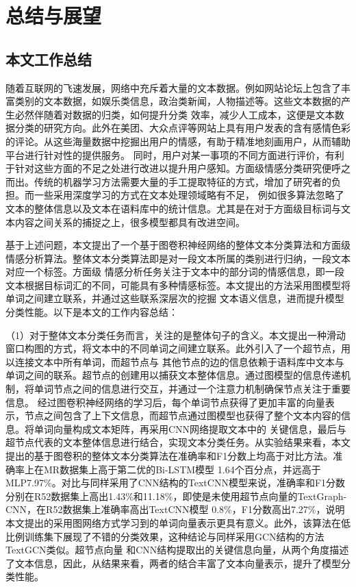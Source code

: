 \chapter{总结与展望}
\section{本文工作总结}
随着互联网的飞速发展，网络中充斥着大量的文本数据。例如网站论坛上包含了丰富类别的文本数据，如娱乐类信息，政治类新闻，人物描述等。这些文本数据的产生必然伴随着对数据的归类，如何提升分类
效率，减少人工成本，这便是文本数据分类的研究方向。此外在美团、大众点评等网站上具有用户发表的含有感情色彩的评论。从这些海量数据中挖掘出用户的情感，有助于精准地刻画用户，从而辅助平台进行针对性的提供服务。
同时，用户对某一事项的不同方面进行评价，有利于针对这些方面的不足之处进行改进以提升用户感知。方面级情感分类研究便呼之而出。传统的机器学习方法需要大量的手工提取特征的方式，增加了研究者的负担。而一些采用深度学习的方式在文本处理领域略有不足，
例如很多算法忽略了文本的整体信息以及文本在语料库中的统计信息。尤其是在对于方面级目标词与文本内容之间关系的捕捉之上，很多模型都具有改进空间。

基于上述问题，本文提出了一个基于图卷积神经网络的整体文本分类算法和方面级情感分析算法。整体文本分类算法即是对一段文本所属的类别进行归纳，一段文本对应一个标签。方面级
情感分析任务关注于文本中的部分词的情感信息，即一段文本根据目标词汇的不同，可能具有多种情感标签。本文提出的方法采用图模型将单词之间建立联系，并通过这些联系深层次的挖掘
文本语义信息，进而提升模型分类性能。以下是本文的工作内容总结：

（1）对于整体文本分类任务而言，关注的是整体句子的含义。本文提出一种滑动窗口构图的方式，将文本中的不同单词之间建立联系。此外引入了一个超节点，用以连接文本中所有单词，而超节点与
其他节点的边的信息依赖于语料库中文本与单词之间的联系。超节点的创建用以捕获文本整体信息。通过图模型的信息传递机制，将单词节点之间的信息进行交互，并通过一个注意力机制确保节点关注于重要信息。
经过图卷积神经网络的学习后，每个单词节点获得了更加丰富的向量表示，节点之间包含了上下文信息，而超节点通过图模型也获得了整个文本内容的信息。将单词向量构成文本矩阵，再采用CNN网络提取文本中的
关键信息，最后与超节点代表的文本整体信息进行结合，实现文本分类任务。从实验结果来看，本文提出的基于图卷积的整体文本分类算法在准确率和F1分数上均高于对比方法。准确率上在MR数据集上高于第二优的Bi-LSTM模型
1.64个百分点，并远高于MLP7.97\%。对比与同样采用了CNN结构的TextCNN模型来说，准确率和F1分数分别在R52数据集上高出1.43\%和11.18\%，即使是未使用超节点向量的TextGraph-CNN，在R52数据集上准确率高出TextCNN模型
0.8\%，F1分数高出7.27\%，说明本文提出的采用图网络方式学习到的单词向量表示更具有意义。此外，该算法在低比例训练集下展现了不错的分类效果，这种结论与同样采用GCN结构的方法TextGCN类似。超节点向量
和CNN结构提取出的关键信息向量，从两个角度描述了文本信息，因此，从结果来看，两者的结合丰富了文本向量表示，提升了模型分类性能。

